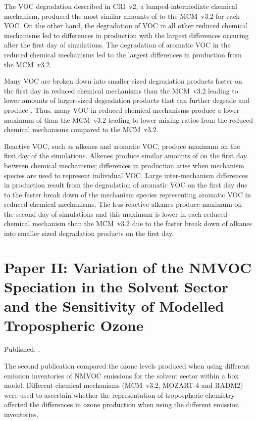 The VOC degradation described in CRI~v2, a lumped-intermediate chemical mechanism, produced the most similar amounts of  to the MCM~v3.2 for each VOC.
On the other hand, the degradation of VOC in all other reduced chemical mechanisms led to differences in  production with the largest differences occuring after the first day of simulations.
The degradation of aromatic VOC in the reduced chemical mechanisms led to the largest differences in  production from the MCM~v3.2.

Many VOC are broken down into smaller-sized degradation products faster on the first day in reduced chemical mechanisms than the MCM~v3.2 leading to lower amounts of larger-sized degradation products that can further degrade and produce .
Thus, many VOC in reduced chemical mechanisms produce a lower maximum of  than the MCM~v3.2 leading to lower  mixing ratios from the reduced chemical mechanisms compared to the MCM~v3.2.

Reactive VOC, such as alkenes and aromatic VOC, produce maximum  on the first day of the simulations.
Alkenes produce similar amounts of  on the first day between chemical mechanisms; differences in  production arise when mechanism species are used to represent individual VOC.
Large inter-mechanism differences in  production result from the degradation of aromatic VOC on the first day due to the faster break down of the mechanism species representing aromatic VOC in reduced chemical mechanisms.
The less-reactive alkanes produce maximum  on the second day of simulations and this maximum is lower in each reduced chemical mechanism than the MCM~v3.2 due to the faster break down of alkanes into smaller sized degradation products on the first day.

\singlespacing
\section[Paper II]{Paper II: Variation of the NMVOC Speciation in the Solvent Sector and the Sensitivity of Modelled Tropospheric Ozone} \label{s:EI_results}
\onehalfspacing

Published: .
\vspace{5mm}

The second publication compared the ozone levels produced when using different emission inventories of NMVOC emissions for the solvent sector within a box model.
Different chemical mechanisms (MCM~v3.2, MOZART-4 and RADM2) were used to ascertain whether the representation of tropospheric chemistry affected the differences in ozone production when using the different emission inventories.

